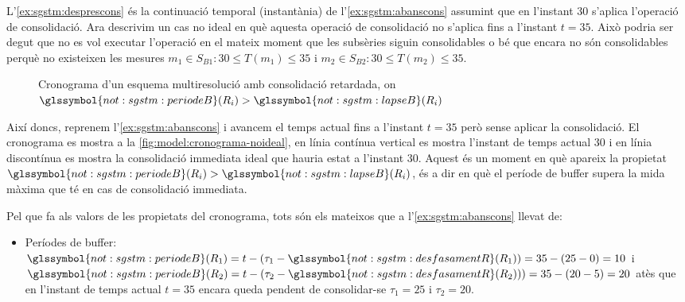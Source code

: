 \begin{example}

  L'\autoref{ex:sgstm:desprescons} és la continuació temporal
  (instantània) de l'\autoref{ex:sgstm:abanscons} assumint que en
  l'instant $30$ s'aplica l'operació de consolidació.  Ara
  descrivim un cas no ideal en què aquesta operació de consolidació no
  s'aplica fins a l'instant $t=35$. Això podria ser degut que no es
  vol executar l'operació en el mateix moment que les subsèries siguin
  consolidables o bé que encara no són consolidables perquè no
  existeixen les mesures $m_1\in S_{B1}: 30\leq T(m_1)\leq 35$ i
  $m_2\in S_{B2}: 30\leq T(m_2)\leq 35$.




\begin{figure}[tp]
  \centering
  
  \caption{Cronograma d'un esquema multiresolució amb consolidació retardada,  on $\glssymbol{not:sgstm:periodeB}(R_i)>\glssymbol{not:sgstm:lapseB}(R_i)$}
  \label{fig:model:cronograma-noideal}
\end{figure}


  Així doncs, reprenem l'\autoref{ex:sgstm:abanscons} i avancem el
  temps actual fins a l'instant $t=35$ però sense aplicar la
  consolidació. El cronograma es mostra a la
  \autoref{fig:model:cronograma-noideal}, en línia contínua vertical
  es mostra l'instant de temps actual $30$ i en línia discontínua
  es mostra la consolidació immediata ideal que hauria estat a
  l'instant $30$.  Aquest és un moment en què apareix la propietat
  $\glssymbol{not:sgstm:periodeB}(R_i)>\glssymbol{not:sgstm:lapseB}(R_i)$,
  és a dir en què el període de buffer supera la mida màxima que té en
  cas de consolidació immediata.



Pel que fa als valors de les propietats del cronograma, tots són els
mateixos que a l'\autoref{ex:sgstm:abanscons} llevat de:
 \begin{itemize}
 \item Períodes de buffer: $\glssymbol{not:sgstm:periodeB}(R_1)
   =t-(\tau_1-\glssymbol{not:sgstm:desfasamentR}(R_1))
   =35-(25-0)=10$ i $\glssymbol{not:sgstm:periodeB}(R_2)
   =t-(\tau_2-\glssymbol{not:sgstm:desfasamentR}(R_2)))
   =35-(20-5)=20$ atès que en l'instant de temps actual $t=35$
   encara queda pendent de consolidar-se $\tau_1=25$ i $\tau_2=20$.
  \end{itemize}

\end{example}



